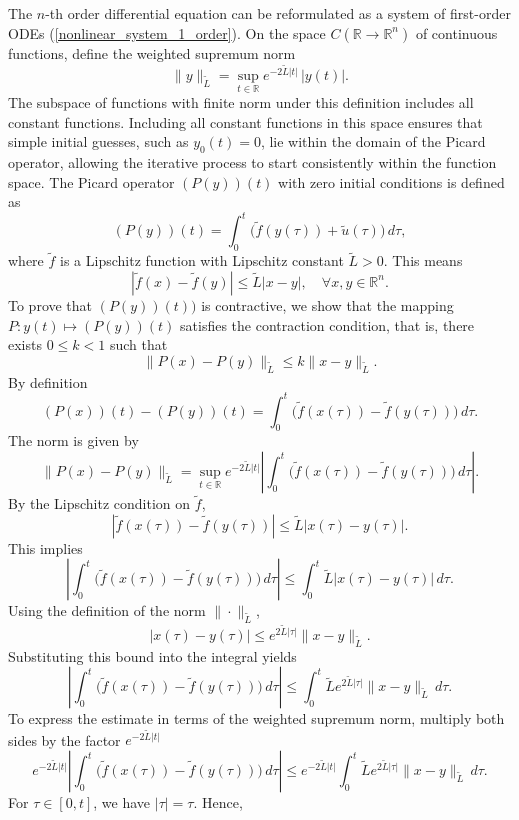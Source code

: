 \documentclass[preprint,12pt]{elsarticle}
\begin{document}
\begin{pf}
The \(n\)-th order differential equation can be reformulated as a system of first-order ODEs (\ref{nonlinear_system_1_order}).
On the space \( C(\mathbb{R} \to \mathbb{R}^n) \) of continuous functions, define the weighted supremum norm
\[
\|y\|_{\tilde L} = \sup_{t \in \mathbb{R}} e^{-2\tilde L|t|}\,|y(t)|.
\]
The subspace of functions with finite norm under this definition includes all constant functions. Including all constant functions in this space ensures that simple initial guesses, such as \(y_0(t) = 0\), lie within the domain of the Picard operator, allowing the iterative process to start consistently within the function space.
The Picard operator
\( (P(y))(t) \) with zero initial conditions is defined as
   \[
   (P(y))(t) = \int_0^t \big(\tilde f(y(\tau))+\tilde u(\tau) \big)\, d\tau,
   \]
   where \( \tilde f \) is a Lipschitz function with Lipschitz constant \( \tilde L > 0 \). This means
   \[
   |\tilde f(x) - \tilde f(y)| \leq \tilde L |x - y|, \quad \forall x, y\in \mathbb{R}^n.
   \]
To prove that \( (P(y))(t)) \) is contractive, we show that the mapping \( P: y(t) \mapsto (P(y))(t) \) satisfies the contraction condition, that is, there exists \( 0 \leq k < 1 \) such that
\[
\|P(x) - P(y)\|_{\tilde L} \leq k \|x - y\|_{\tilde L}.
\]
By definition
\[
(P(x))(t) - (P(y))(t) = \int_0^t \big(\tilde f(x(\tau)) - \tilde f(y(\tau))\big) \, d\tau.
\]
The norm is given by  
\[
\|P(x) - P(y)\|_{\tilde L} 
= \sup_{t \in \mathbb{R}} e^{-2\tilde L |t|} \left| \int_0^t \big(\tilde f(x(\tau)) - \tilde f(y(\tau))\big) \, d\tau \right|.
\]
By the Lipschitz condition on \( \tilde f \),  
\[
|\tilde f(x(\tau)) - \tilde f(y(\tau))| \leq \tilde L |x(\tau) - y(\tau)|.
\]  
This implies 
\[
\left| \int_0^t \big(\tilde f(x(\tau)) - \tilde f(y(\tau))\big) \, d\tau \right| \leq \int_0^t \tilde L |x(\tau) - y(\tau)| \, d\tau.
\]
Using the definition of the norm \( \|\cdot\|_{\tilde L} \),  
\[
|x(\tau) - y(\tau)| \leq e^{2\tilde L |\tau|} \|x - y\|_{\tilde L}.
\]  
Substituting this bound into the integral yields
\[
\left| \int_0^t \big(\tilde f(x(\tau)) - \tilde f(y(\tau))\big) \, d\tau \right| \leq \int_0^t \tilde L e^{2\tilde L |\tau|} \|x - y\|_{\tilde L} \, d\tau.
\]
To express the estimate in terms of the weighted supremum norm, multiply both sides by the factor \( e^{-2\tilde L |t|} \) 
\[
e^{-2\tilde L |t|} \left| \int_0^t \big(\tilde f(x(\tau)) - \tilde f(y(\tau))\big) \, d\tau \right| 
\leq e^{-2\tilde L |t|} \int_0^t \tilde L e^{2\tilde L |\tau|} \|x - y\|_{\tilde L} \, d\tau.
\]
For \( \tau \in [0, t] \), we have \( |\tau| = \tau \). Hence,  

\end{pf}
\end{document}
